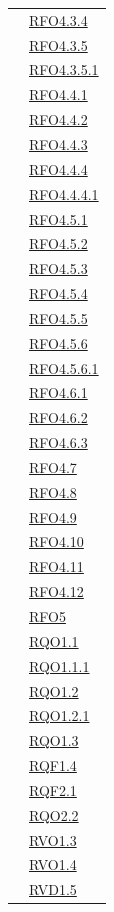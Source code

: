 \begin{longtable}{|>{\centering}m{5cm}|m{5cm}<{\centering}|}
& \hyperlink{RFO4.3.4}{RFO4.3.4}\\
& \hyperlink{RFO4.3.5}{RFO4.3.5}\\
& \hyperlink{RFO4.3.5.1}{RFO4.3.5.1}\\
& \hyperlink{RFO4.4.1}{RFO4.4.1}\\
& \hyperlink{RFO4.4.2}{RFO4.4.2}\\
& \hyperlink{RFO4.4.3}{RFO4.4.3}\\
& \hyperlink{RFO4.4.4}{RFO4.4.4}\\
& \hyperlink{RFO4.4.4.1}{RFO4.4.4.1}\\
& \hyperlink{RFO4.5.1}{RFO4.5.1}\\
& \hyperlink{RFO4.5.2}{RFO4.5.2}\\
& \hyperlink{RFO4.5.3}{RFO4.5.3}\\
& \hyperlink{RFO4.5.4}{RFO4.5.4}\\
& \hyperlink{RFO4.5.5}{RFO4.5.5}\\
& \hyperlink{RFO4.5.6}{RFO4.5.6}\\
& \hyperlink{RFO4.5.6.1}{RFO4.5.6.1}\\
& \hyperlink{RFO4.6.1}{RFO4.6.1}\\
& \hyperlink{RFO4.6.2}{RFO4.6.2}\\
& \hyperlink{RFO4.6.3}{RFO4.6.3}\\
& \hyperlink{RFO4.7}{RFO4.7}\\
& \hyperlink{RFO4.8}{RFO4.8}\\
& \hyperlink{RFO4.9}{RFO4.9}\\
& \hyperlink{RFO4.10}{RFO4.10}\\
& \hyperlink{RFO4.11}{RFO4.11}\\
& \hyperlink{RFO4.12}{RFO4.12}\\
& \hyperlink{RFO5}{RFO5}\\
& \hyperlink{RQO1.1}{RQO1.1}\\
& \hyperlink{RQO1.1.1}{RQO1.1.1}\\
& \hyperlink{RQO1.2}{RQO1.2}\\
& \hyperlink{RQO1.2.1}{RQO1.2.1}\\
& \hyperlink{RQO1.3}{RQO1.3}\\
& \hyperlink{RQF1.4}{RQF1.4}\\
& \hyperlink{RQF2.1}{RQF2.1}\\
& \hyperlink{RQO2.2}{RQO2.2}\\
& \hyperlink{RVO1.3}{RVO1.3}\\
& \hyperlink{RVO1.4}{RVO1.4}\\
& \hyperlink{RVD1.5}{RVD1.5}\\

\end{longtable}
